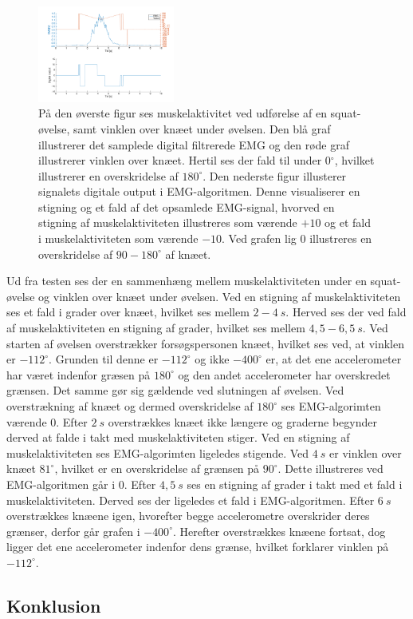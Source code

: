 \begin{figure}[H]
\centering
\includegraphics[width=0.4\textwidth]{figures/test_brugerinput}
\caption{På den øverste figur ses muskelaktivitet ved udførelse af en squat-øvelse, samt vinklen over knæet under øvelsen. Den blå graf illustrerer det samplede digital filtrerede EMG og den røde graf illustrerer vinklen over knæet. Hertil ses der fald til under 0$^{\circ}$, hvilket illustrerer en overskridelse af $180^{\circ}$. Den nederste figur illusterer signalets digitale output i EMG-algoritmen. Denne visualiserer en stigning og et fald af det opsamlede EMG-signal, hvorved en stigning af muskelaktiviteten illustreres som værende $+10$ og et fald i muskelaktiviteten som værende $-10$. Ved grafen lig 0 illustreres en overskridelse af $90-180^{\circ}$ af knæet.}
\label{fig:test_brugerinput}
\end{figure}

Ud fra testen ses der en sammenhæng mellem muskelaktiviteten under en squat-øvelse og vinklen over knæet under øvelsen. Ved en stigning af muskelaktiviteten ses et fald i grader over knæet, hvilket ses mellem $2-4~s$. Herved ses der ved fald af muskelaktiviteten en stigning af grader, hvilket ses mellem $4,5-6,5~s$.
Ved starten af øvelsen overstrækker forsøgspersonen knæet, hvilket ses ved, at vinklen er $-112^{\circ}$. Grunden til denne er $-112^{\circ}$ og ikke $-400^{\circ}$ er, at det ene accelerometer har været indenfor græsen på $180^{\circ}$ og den andet accelerometer har overskredet grænsen. Det samme gør sig gældende ved slutningen af øvelsen. Ved overstrækning af knæet og dermed overskridelse af $180^{\circ}$ ses EMG-algorimten værende 0. 
Efter $2~s$ overstrækkes knæet ikke længere og graderne begynder derved at falde i takt med muskelaktiviteten stiger. Ved en stigning af muskelaktiviteten ses EMG-algorimten ligeledes stigende. Ved $4~s$ er vinklen over knæet $81^{\circ}$, hvilket er en overskridelse af grænsen på $90^{\circ}$. Dette illustreres ved EMG-algoritmen går i 0. 
Efter $4,5~s$ ses en stigning af grader i takt med et fald i muskelaktiviteten. Derved ses der ligeledes et fald i EMG-algoritmen. 
Efter $6~s$ overstrækkes knæene igen, hvorefter begge accelerometre overskrider deres grænser, derfor går grafen i $-400^{\circ}$. Herefter overstrækkes knæene fortsat, dog ligger det ene accelerometer indenfor dens grænse, hvilket forklarer vinklen på $-112^{\circ}$. 




\subsection{Konklusion}
